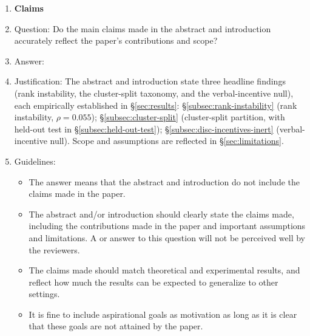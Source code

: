 \documentclass{article}
\begin{document}
 



\begin{enumerate}

\item {\bf Claims}
    \item[] Question: Do the main claims made in the abstract and introduction accurately reflect the paper's contributions and scope?
    \item[] Answer: \answerYes{} %
    \item[] Justification: The abstract and introduction state three headline findings (rank instability, the cluster-split taxonomy, and the verbal-incentive null), each empirically established in \S\ref{sec:results}: \S\ref{subsec:rank-instability} (rank instability, $\rho = 0.055$); \S\ref{subsec:cluster-split} (cluster-split partition, with held-out test in \S\ref{subsec:held-out-test}); \S\ref{subsec:disc-incentives-inert} (verbal-incentive null). Scope and assumptions are reflected in \S\ref{sec:limitations}.
    \item[] Guidelines:
    \begin{itemize}
        \item The answer \answerNA{} means that the abstract and introduction do not include the claims made in the paper.
        \item The abstract and/or introduction should clearly state the claims made, including the contributions made in the paper and important assumptions and limitations. A \answerNo{} or \answerNA{} answer to this question will not be perceived well by the reviewers. 
        \item The claims made should match theoretical and experimental results, and reflect how much the results can be expected to generalize to other settings. 
        \item It is fine to include aspirational goals as motivation as long as it is clear that these goals are not attained by the paper. 
    \end{itemize}


\end{enumerate}
\end{document}
